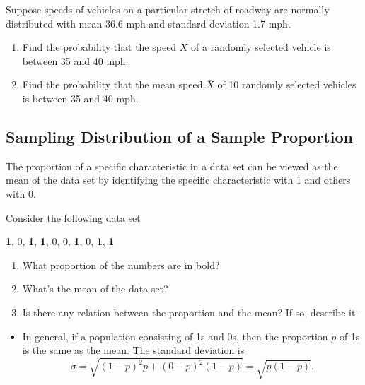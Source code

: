 \vspace*{6\baselineskip}

\begin{example}

Suppose speeds of vehicles on a particular stretch of roadway are
normally distributed with mean 36.6 mph and standard deviation 1.7 mph.

\begin{enumerate}
\item
  Find the probability that the speed \(X\) of a randomly selected
  vehicle is between 35 and 40 mph.
\item
  Find the probability that the mean speed \(\bar{X}\) of 10 randomly
  selected vehicles is between 35 and 40 mph.
\end{enumerate}

\end{example}

\hypertarget{sampling-distribution-of-a-sample-proportion}{%
\subsection{Sampling Distribution of a Sample
Proportion}\label{sampling-distribution-of-a-sample-proportion}}

The proportion of a specific characteristic in a data set can be viewed
as the mean of the data set by identifying the specific characteristic
with 1 and others with \(0\).

\begin{example}

Consider the following data set

\textbf{1}, 0, \textbf{1}, \textbf{1}, 0, 0, \textbf{1}, 0, \textbf{1},
\textbf{1}

\begin{enumerate}
\item
  What proportion of the numbers are in bold?
\item
  What's the mean of the data set?
\item
  Is there any relation between the proportion and the mean? If so,
  describe it.
\end{enumerate}

\end{example}

\begin{itemize}
  \item 
  In general, if a population consisting of 1s and 0s, then the proportion
  \(p\) of 1s is the same as the mean. The standard deviation is
  \[\sigma=\sqrt{(1-p)^2p+(0-p)^2(1-p)}=\sqrt{p(1-p)}.\]
\end{itemize}

